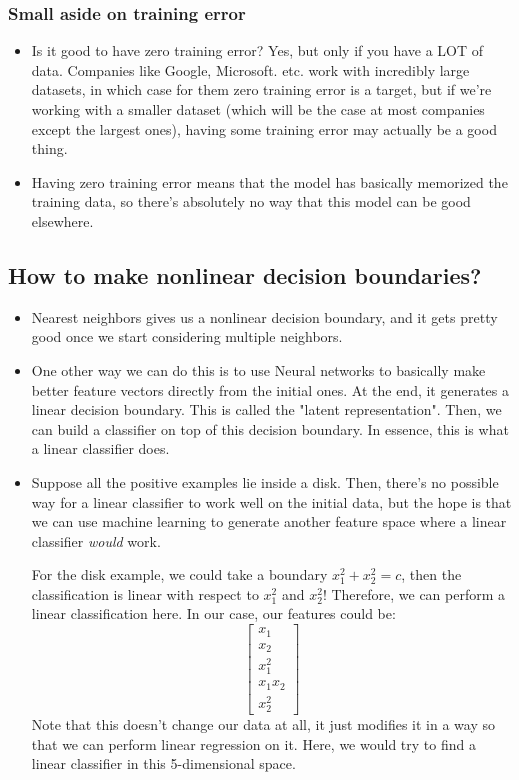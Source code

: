 \subsubsection{Small aside on training error} 
\begin{itemize}
	\item Is it good to have zero training error? Yes, but only if you have a LOT of
		data. Companies like Google, Microsoft. etc. work with incredibly large
		datasets, in which case for them zero training error is a target, but if
		we're working with a smaller dataset (which will be the case at most
		companies except the largest ones), having some training error may actually
		be a good thing. 
	\item Having zero training error means that the model has basically memorized the
		training data, so there's absolutely no way that this model can be good
		elsewhere.     
\end{itemize}

\subsection{How to make nonlinear decision boundaries?}
\begin{itemize}
	\item Nearest neighbors gives us a nonlinear decision boundary, and it gets
		pretty good once we start considering multiple neighbors. 
	\item One other way we can do this is to use Neural networks to basically make
		better feature vectors directly from the initial ones. At the end, it
		generates a linear decision boundary. This is called the "latent
		representation". Then, we can build a classifier on top
		of this decision boundary. In essence, this is what a linear classifier does. 
	\item Suppose all the positive examples lie inside a disk. Then, there's no
		possible way for a linear classifier to work well on the initial data, but
		the hope is that we can use machine learning to generate another feature
		space where a linear classifier \textit{would} work.    

		For the disk example, we could take a boundary \( x_1^2 + x_2^2 = c \), then
		the classification is linear with respect to \( x_1^2 \) and \( x_2^2 \)!
		Therefore, we can perform a linear classification here. In our case, our
		features could be:
		\[
			\begin{bmatrix} x_1 \\ x_2 \\ x_1^2 \\ x_1x_2 \\ x_2^2 \end{bmatrix}
		\]
		Note that this doesn't change our data at all, it just modifies it in a way
		so that we can perform linear regression on it. Here, we would try to find
		a linear classifier in this 5-dimensional space.       
\end{itemize}


